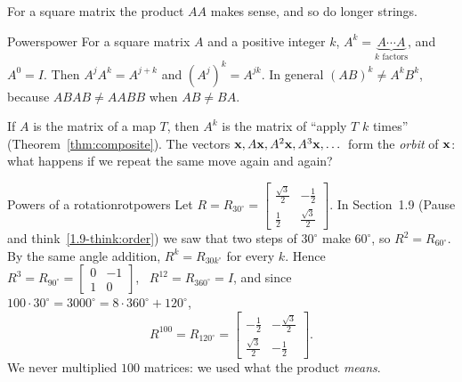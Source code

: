 \documentclass[11pt]{article}
\begin{document}
For a square matrix the product $AA$ makes sense, and so do longer strings.

\begin{defn}{Powers}{power}
For a square matrix $A$ and a positive integer $k$, $A^k=\underbrace{A\cdots A}_{k\text{ factors}}$, and $A^0=I$. Then $A^jA^k=A^{j+k}$ and $(A^j)^k=A^{jk}$. In general $(AB)^k\neq A^kB^k$, because $ABAB\neq AABB$ when $AB\neq BA$.
\end{defn}

If $A$ is the matrix of a map $T$, then $A^k$ is the matrix of ``apply $T$ $k$ times'' (Theorem~\ref{thm:composite}). The vectors $\mathbf{x},A\mathbf{x},A^2\mathbf{x},A^3\mathbf{x},\dots$ form the \emph{orbit} of $\mathbf{x}$: what happens if we repeat the same move again and again?

\begin{exmp}{Powers of a rotation}{rotpowers}
Let $R=R_{30^\circ}=\begin{bmatrix}\tfrac{\sqrt3}{2}&-\tfrac12\\\tfrac12&\tfrac{\sqrt3}{2}\end{bmatrix}$. In Section~1.9 (Pause and think~\ref{1.9-think:order}) we saw that two steps of $30^\circ$ make $60^\circ$, so $R^2=R_{60^\circ}$. By the same angle addition, $R^k=R_{30k^\circ}$ for every $k$. Hence $R^3=R_{90^\circ}=\begin{bmatrix}0&-1\\1&0\end{bmatrix}$, \ $R^{12}=R_{360^\circ}=I$, and since $100\cdot30^\circ=3000^\circ=8\cdot360^\circ+120^\circ$,
\[
R^{100}=R_{120^\circ}=\begin{bmatrix}-\tfrac12&-\tfrac{\sqrt3}{2}\\\tfrac{\sqrt3}{2}&-\tfrac12\end{bmatrix}.
\]
We never multiplied $100$ matrices: we used what the product \emph{means}.
\end{exmp}
\end{document}
